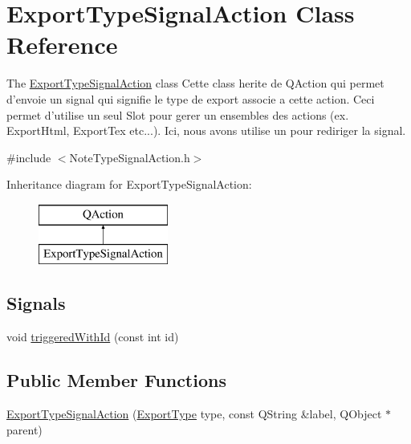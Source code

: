 \hypertarget{class_export_type_signal_action}{\section{Export\-Type\-Signal\-Action Class Reference}
\label{class_export_type_signal_action}
}


The \hyperlink{class_export_type_signal_action}{Export\-Type\-Signal\-Action} class Cette class herite de Q\-Action qui permet d'envoie un signal qui signifie le type de export associe a cette action. Ceci permet d'utilise un seul Slot pour gerer un ensembles des actions (ex. Export\-Html, Export\-Tex etc...). Ici, nous avons utilise un  pour rediriger la signal.  




{\ttfamily \#include $<$Note\-Type\-Signal\-Action.\-h$>$}

Inheritance diagram for Export\-Type\-Signal\-Action\-:\begin{figure}[H]
\begin{center}
\leavevmode
\includegraphics[height=2.000000cm]{class_export_type_signal_action}
\end{center}
\end{figure}
\subsection*{Signals}
\begin{DoxyCompactItemize}
\item 
void \hyperlink{class_export_type_signal_action_a7a7a65c6d9cd0f5a9aa778feeeab309d}{triggered\-With\-Id} (const int id)
\end{DoxyCompactItemize}
\subsection*{Public Member Functions}
\begin{DoxyCompactItemize}
\item 
\hyperlink{class_export_type_signal_action_a69afa74878285db03f2601cb55f3da98}{Export\-Type\-Signal\-Action} (\hyperlink{_export_strategy_8h_a6bd23bde1932319c9832c0129a94b307}{Export\-Type} type, const Q\-String \&label, Q\-Object $\ast$parent)
\end{DoxyCompactItemize}


